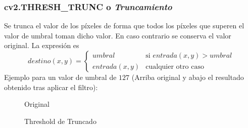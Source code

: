 \subsubsection{cv2.THRESH\_TRUNC o \emph{Truncamiento}}
Se trunca el valor de los píxeles de forma que todos los píxeles que
superen el valor de umbral toman dicho valor. En caso contrario se
conserva el valor original. La expresión es
\begin{equation*}
  destino(x, y) =
  \begin{cases}
    umbral & \text{si } entrada(x, y) > umbral \\
    entrada(x, y) & \text{cualquier otro caso}
  \end{cases}
\end{equation*}
Ejemplo para un valor de umbral de $127$ (Arriba original y abajo el
resultado obtenido tras aplicar el filtro):

\begin{figure}[H]
  \caption{Original}
  \centering \setlength\fboxsep{0pt} \setlength\fboxrule{0.5pt}
\end{figure}

\begin{figure}[H]
  \centering \setlength\fboxsep{0pt} \setlength\fboxrule{0.5pt}
  \caption{Threshold de Truncado}
\end{figure}


